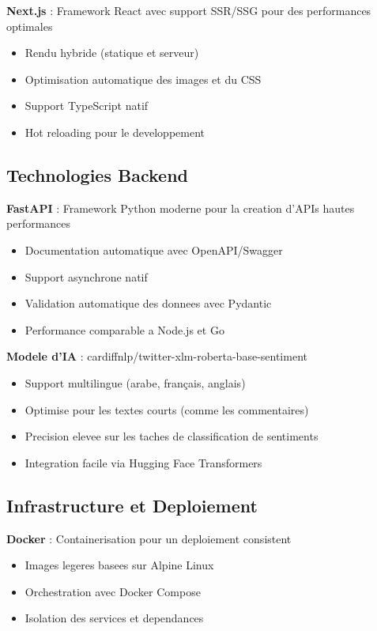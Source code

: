 \textbf{Next.js} : Framework React avec support SSR/SSG pour des performances optimales
\begin{itemize}
    \item Rendu hybride (statique et serveur)
    \item Optimisation automatique des images et du CSS
    \item Support TypeScript natif
    \item Hot reloading pour le developpement
\end{itemize}

\subsection{Technologies Backend}

\textbf{FastAPI} : Framework Python moderne pour la creation d'APIs hautes performances
\begin{itemize}
    \item Documentation automatique avec OpenAPI/Swagger
    \item Support asynchrone natif
    \item Validation automatique des donnees avec Pydantic
    \item Performance comparable a Node.js et Go
\end{itemize}

\textbf{Modele d'IA} : cardiffnlp/twitter-xlm-roberta-base-sentiment
\begin{itemize}
    \item Support multilingue (arabe, français, anglais)
    \item Optimise pour les textes courts (comme les commentaires)
    \item Precision elevee sur les taches de classification de sentiments
    \item Integration facile via Hugging Face Transformers
\end{itemize}

\subsection{Infrastructure et Deploiement}

\textbf{Docker} : Containerisation pour un deploiement consistent
\begin{itemize}
    \item Images legeres basees sur Alpine Linux
    \item Orchestration avec Docker Compose
    \item Isolation des services et dependances
\end{itemize}

